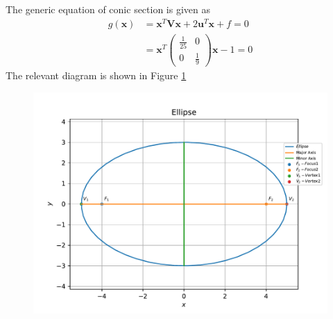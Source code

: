 \documentclass[12pt]{article}
\providecommand{\brak}[1]{\ensuremath{\left(#1\right)}}
\newcommand{\myvec}[1]{\ensuremath{\begin{pmatrix}#1\end{pmatrix}}}
\let\vec\mathbf
\begin{document}
\begin{enumerate}
The generic equation of conic section is given as
\begin{align}
	\label{eq:ellipseEq2}
	g\brak{\vec{x}} &= \vec{x}^T\vec{V}\vec{x} + 2\vec{u}^T\vec{x} + f = 0 \\ 
	&= \vec{x}^T\myvec{\frac{1}{25} & 0 \\ 0 & \frac{1}{9}}\vec{x}- 1  = 0 
\end{align}
The relevant diagram is shown in Figure \ref{fig:Fig1}
\begin{figure}[!h]
	\begin{center}
		\includegraphics[width=\columnwidth]{figs/problem7.pdf}
	\end{center}
\caption{}
\label{fig:Fig1}
\end{figure}
\end{enumerate}
\end{document}
